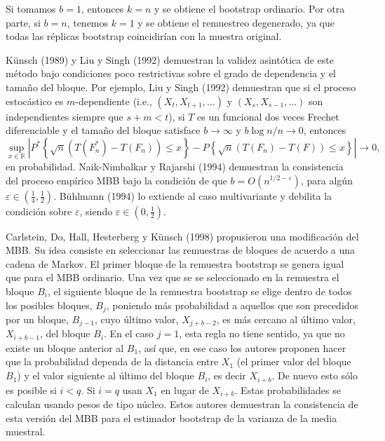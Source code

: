 \documentclass[
]{book}
\theoremstyle{definition}
\theoremstyle{definition}
\theoremstyle{definition}
\theoremstyle{remark}
\begin{document}
Si tomamos \(b=1\), entonces \(k=n\) y se obtiene el bootstrap ordinario.
Por otra parte, si \(b=n\), tenemos \(k=1\) y se obtiene el remuestreo
degenerado, ya que todas las réplicas bootstrap coincidirían con la
muestra original.

Künsch (1989) y Liu y Singh (1992) demuestran la validez asintótica de
este método bajo condiciones poco restrictivas sobre el grado de
dependencia y el tamaño del bloque. Por ejemplo, Liu y Singh (1992)
demuestran que si el proceso estocástico es \(m\)-dependiente (i.e.,
\((X_{t},X_{t+1},\ldots )\) y \((X_{s},X_{s-1},\ldots )\) son independientes
siempre que \(s+m<t\)), si \(T\) es un funcional dos veces Frechet
diferenciable y el tamaño del bloque satisface \(b\rightarrow \infty\) y
\(b\log n/n\rightarrow 0\), entonces
\[\sup_{x\in \mathbb{R}}\left\vert P^{\ast}\left\{ \sqrt{n}\left(
T(F_n^{\ast})-T\left( F_n \right) \right) \leq x\right\} -P\left\{ \sqrt{
n}\left( T(F_n)-T\left( F \right) \right) \leq x\right\} \right\vert
\rightarrow 0\mathrm{,}\]en probabilidad. Naik-Nimbalkar y Rajarshi
(1994) demuestran la consistencia del proceso empírico MBB bajo la
condición de que \(b=O(n^{1/2-\varepsilon })\), para algún
\(\varepsilon \in (\frac{1}{4},\frac{1}{2})\). Bühlmann (1994) lo extiende
al caso multivariante y debilita la condición sobre \(\varepsilon\),
siendo \(\varepsilon \in (0,\frac{1}{2})\).

Carlstein, Do, Hall, Hesterberg y Künsch (1998) propusieron una
modificación del MBB. Su idea consiste en seleccionar las remuestras de
bloques de acuerdo a una cadena de Markov. El primer bloque de la
remuestra bootstrap se genera igual que para el MBB ordinario. Una vez
que se se seleccionado en la remuestra el bloque \(B_i\), el siguiente
bloque de la remuestra bootstrap se elige dentro de todos los posibles
bloques, \(B_j\), poniendo más probabilidad a aquellos que son
precedidos por un bloque,
\(B_{j-1}\), cuyo último valor, \(X_{j+b-2}\), es más cercano al último
valor, \(X_{i+b-1}\), del bloque \(B_i\). En el caso \(j=1\), esta regla no
tiene sentido, ya que no existe un bloque anterior al \(B_1\), así que,
en ese caso los autores proponen hacer que la probabilidad dependa de la
distancia entre \(X_1\) (el primer valor del bloque \(B_1\)) y el valor
siguiente al último del bloque \(B_i\), es decir \(X_{i+b}\). De nuevo
esto sólo es posible si \(i<q\). Si \(i=q\) usan \(X_1\) en lugar de
\(X_{i+b}\). Estas probabilidades se calculan usando pesos de tipo núcleo.
Estos autores demuestran la consistencia de esta versión del MBB para el
estimador bootstrap de la varianza de la media muestral.
\end{document}
